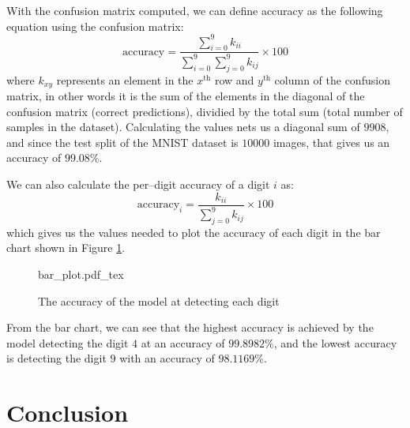 \documentclass[conference]{IEEEtran}
\begin{document}
\par With the confusion matrix computed, we can define accuracy as the following equation using the confusion matrix:
\begin{equation}
    \text{accuracy} = \frac{\sum_{i = 0}^9 k_{ii}}{\sum_{i = 0}^9 \sum_{j = 0}^9 k_{ij}} \times 100
\end{equation}
where $k_{xy}$ represents an element in the $x^\text{th}$ row and $y^\text{th}$ column of the confusion matrix, in other words it is the sum of the elements in the diagonal of the confusion matrix (correct predictions), dividied by the total sum (total number of samples in the dataset). Calculating the values nets us a diagonal sum of $9908$, and since the test split of the MNIST dataset is $10000$ images, that gives us an accuracy of $99.08\%$.
\par
We can also calculate the per--digit accuracy of a digit $i$ as:
\begin{equation}
    \text{accuracy}_{i} = \frac{k_{ii}}{\sum_{j = 0}^9 k_{ij}} \times 100
\end{equation}
which gives us the values needed to plot the accuracy of each digit in the bar chart shown in Figure \ref{fig:bar}.
\begin{figure}[!htp]
    \centering
    \def\svgwidth{\columnwidth}
    {bar_plot.pdf_tex}
    \caption{The accuracy of the model at detecting each digit}\label{fig:bar}
\end{figure}
\par From the bar chart, we can see that the highest accuracy is achieved by the model detecting the digit $4$ at an accuracy of $99.8982\%$, and the lowest accuracy is detecting the digit $9$ with an accuracy of $98.1169\%$.
\section{Conclusion}
\blindtext



\end{document}
